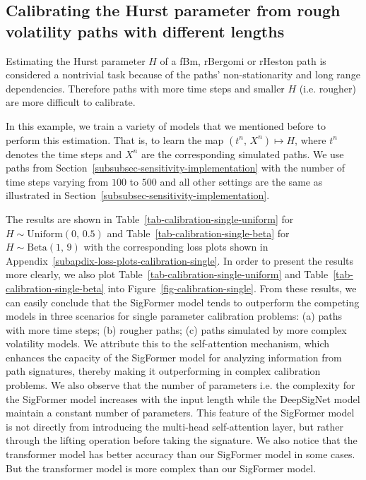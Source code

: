 \documentclass[]{article}
\renewcommand{\(}{\left(}
\renewcommand{\)}{\right)}
\begin{document}
	\subsection{Calibrating the Hurst parameter from rough volatility paths with different lengths}
	\label{subsec-single-calibration}
	Estimating the Hurst parameter $H$ of a fBm, rBergomi or rHeston path is considered a nontrivial task because of the paths’ non-stationarity and long range dependencies. Therefore paths with more time steps and smaller $H$ (i.e. rougher) are more difficult to calibrate. 
	
	In this example, we train a variety of models that we mentioned before to perform this estimation. That is, to learn the map $(t^n,\,X^n)\mapsto H$, where $t^n$ denotes the time steps and $X^n$ are the corresponding simulated paths. We use paths from Section~\ref{subsubsec-sensitivity-implementation} with the number of time steps varying from $100$ to $500$ and all other settings are the same as illustrated in Section~\ref{subsubsec-sensitivity-implementation}.
		
	The results are shown in Table~\ref{tab-calibration-single-uniform} for $H\sim\text{Uniform}(0,\,0.5)$ and Table~\ref{tab-calibration-single-beta} for $H\sim\text{Beta}(1,\,9)$ with the corresponding loss plots shown in Appendix~\ref{subapdix-loss-plots-calibration-single}. In order to present the results more clearly, we also plot Table~\ref{tab-calibration-single-uniform} and Table~\ref{tab-calibration-single-beta} into Figure~\ref{fig-calibration-single}. 
	From these results, we can easily conclude that the SigFormer model tends to outperform the competing models in three scenarios for single parameter calibration problems: (a) paths with more time steps; (b) rougher paths; (c) paths simulated by more complex volatility models. We attribute this to the self-attention mechanism, which enhances the capacity of the SigFormer model for analyzing information from path signatures, thereby making it outperforming in complex calibration problems. 
	We also observe that the number of parameters i.e. the complexity for the SigFormer model increases with the input length while the DeepSigNet model maintain a constant number of parameters. This feature of the SigFormer model is not directly from introducing the multi-head self-attention layer, but rather through the lifting operation before taking the signature. We also notice that the transformer model has better accuracy than our SigFormer model in some cases. But the transformer model is more complex than our SigFormer model.
	
\end{document}
